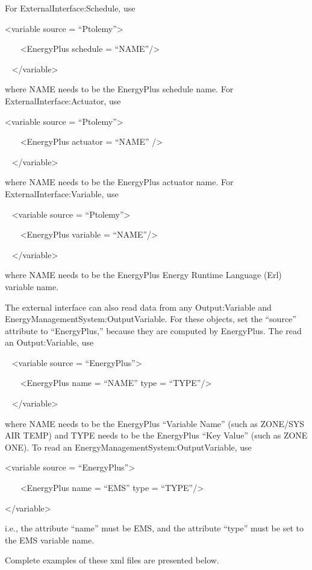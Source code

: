 For ExternalInterface:Schedule, use

\textless{}variable source = ``Ptolemy''\textgreater{}

~~~ \textless{}EnergyPlus schedule = ``NAME''/\textgreater{}

~ \textless{}/variable\textgreater{}

where NAME needs to be the EnergyPlus schedule name. For ExternalInterface:Actuator, use

\textless{}variable source = ``Ptolemy''\textgreater{}

~~~ \textless{}EnergyPlus actuator = ``NAME'' /\textgreater{}

~ \textless{}/variable\textgreater{}

where NAME needs to be the EnergyPlus actuator name. For ExternalInterface:Variable, use

~ \textless{}variable source = ``Ptolemy''\textgreater{}

~~~ \textless{}EnergyPlus variable = ``NAME''/\textgreater{}

~ \textless{}/variable\textgreater{}

where NAME needs to be the EnergyPlus Energy Runtime Language (Erl) variable name.

The external interface can also read data from any Output:Variable and EnergyManagementSystem:OutputVariable. For these objects, set the ``source'' attribute to ``EnergyPlus,'' because they are computed by EnergyPlus. The read an Output:Variable, use

~ \textless{}variable source = ``EnergyPlus''\textgreater{}

~~~ \textless{}EnergyPlus name = ``NAME'' type = ``TYPE''/\textgreater{}

~ \textless{}/variable\textgreater{}

where NAME needs to be the EnergyPlus ``Variable Name'' (such as ZONE/SYS AIR TEMP) and TYPE needs to be the EnergyPlus ``Key Value'' (such as ZONE ONE). To read an EnergyManagementSystem:OutputVariable, use

\textless{}variable source = ``EnergyPlus''\textgreater{}

~~~ \textless{}EnergyPlus name = ``EMS'' type = ``TYPE''/\textgreater{}

\textless{}/variable\textgreater{}

i.e., the attribute ``name'' must be EMS, and the attribute ``type'' must be set to the EMS variable name.

Complete examples of these xml files are presented below.

